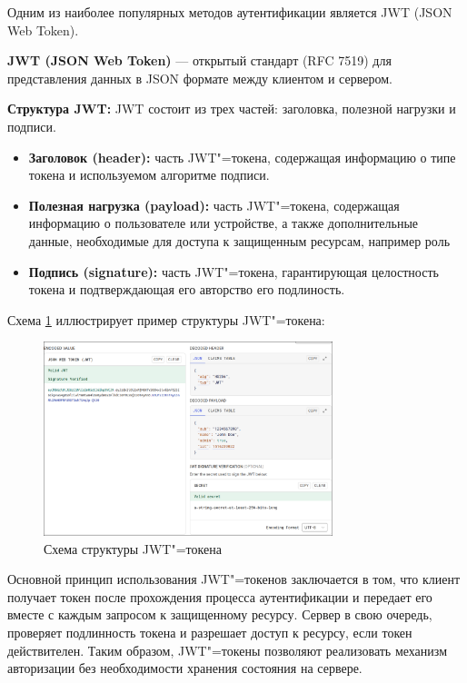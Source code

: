 Одним из наиболее популярных методов аутентификации является JWT (JSON Web Token).

\textbf{JWT (JSON Web Token)} --- открытый стандарт (RFC 7519) для представления данных в JSON формате между клиентом и сервером.


\textbf{Структура JWT:} JWT состоит из трех частей: заголовка, полезной нагрузки и подписи.
\begin{itemize}
	\item{\textbf{Заголовок (header):} часть JWT"=токена, содержащая информацию о типе токена и используемом алгоритме подписи.}
	\item{\textbf{Полезная нагрузка (payload):} часть JWT"=токена, содержащая информацию о пользователе или устройстве, а также дополнительные данные, необходимые для доступа к защищенным ресурсам, например роль}
	\item{\textbf{Подпись (signature):} часть JWT"=токена, гарантирующая целостность токена и подтверждающая его авторство его подлиность.}
\end{itemize}

Схема \ref{fig:JWT} иллюстрирует пример структуры JWT"=токена:

\newpage
\begin{figure}[!h]
    \centering
    \includegraphics[width = 0.75\textwidth]{imgs/theoryJWT.png}
    \caption{Схема структуры JWT"=токена}
    \label{fig:JWT}
\end{figure}

Основной принцип использования JWT"=токенов заключается в том, что клиент получает токен после прохождения процесса аутентификации и передает его вместе с каждым запросом к защищенному ресурсу. Сервер в свою очередь, проверяет подлинность токена и разрешает доступ к ресурсу, если токен действителен. Таким образом, JWT"=токены позволяют реализовать механизм авторизации без необходимости хранения состояния на сервере. \cite{jwt2}

